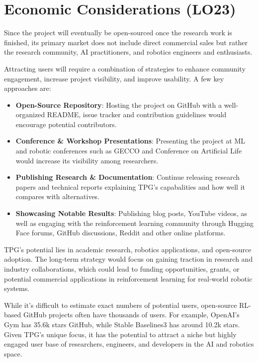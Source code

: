 \documentclass{article}
\begin{document}

\section{Economic Considerations (LO23)}

Since the project will eventually be open-sourced once the research work is finished, its primary market does
not include direct commercial sales but rather the research community, AI practitioners, and robotics engineers 
and enthusiasts. 

Attracting users will require a combination of strategies to enhance community engagement,
increase project visibility, and improve usability. A few key approaches are:

\begin{itemize}
    \item \textbf{Open-Source Repository}: Hosting the project on GitHub with a well-organized README, issue tracker and contribution
        guidelines would encourage potential contributors.
    \item \textbf{Conference \& Workshop Presentations}: Presenting the project at ML and robotic conferences such as GECCO and Conference
        on Artificial Life would increase its visibility among researchers.
    \item \textbf{Publishing Research \& Documentation}: Continue releasing research papers and technical reports explaining TPG's 
        capabalities and how well it compares with alternatives.
    \item \textbf{Showcasing Notable Results}: Publishing blog posts, YouTube videos, as well as engaging with the reinforcement learning community
        through Hugging Face forums, GitHub discussions, Reddit and other online platforms. 
\end{itemize}

TPG's potential lies in academic research, robotics applications, and open-source adoption. The long-term strategy 
would focus on gaining traction in research and industry collaborations, which could lead to funding opportunities, 
grants, or potential commercial applications in reinforcement learning for real-world robotic systems.

While it's difficult to estimate exact numbers of potential users, open-source RL-based GitHub projects often have
thousands of users. For example, OpenAI's Gym has 35.6k stars GitHub, while Stable Baselines3 has around 10.2k stars. Given 
TPG's unique focus, it has the potential to attract a niche but highly engaged user base of researchers, engineers, 
and developers in the AI and robotics space.
\end{document}
